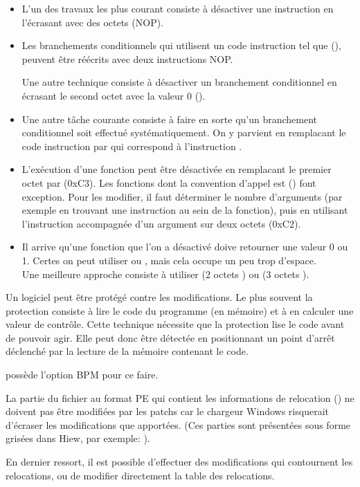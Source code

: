 \begin{itemize}

\item 
L'un des travaux les plus courant consiste à désactiver une instruction en l'écrasant avec des 
octets  (\ac{NOP}).

\item Les branchements conditionnels qui utilisent un code instruction tel que  (\JZ), 
peuvent être réécrits avec deux instructions \ac{NOP}.

Une autre technique consiste à désactiver un branchement conditionnel en écrasant le second octet 
avec la valeur 0 ().

\item 
Une autre tâche courante consiste à faire en sorte qu'un branchement conditionnel soit effectué 
systématiquement. On y parvient en remplacant le code instruction par  qui correspond à 
l'instruction \JMP.

\item L'exécution d'une fonction peut être désactivée en remplacant le premier octet par \RETN (0xC3).
Les fonctions dont la convention d'appel est  () font exception. 
Pour les modifier, il faut déterminer le nombre d'arguments (par exemple en trouvant une instruction 
\RETN au sein de la fonction), puis en utilisant l'instruction \RETN accompagnée d'un argument sur 
deux octets (0xC2).

\item Il arrive qu'une fonction que l'on a désactivé doive retourner une valeur 0 ou 1. Certes on 
peut utiliser  ou , mais cela occupe un peu trop d'espace.\\
Une meilleure approche consiste à utiliser  (2 octets ) ou 
 (3 octets ).

\end{itemize}

Un logiciel peut être protégé contre les modifications. Le plus souvent la protection consiste à 
lire le code du programme (en mémoire) et à en calculer une valeur de contrôle.
Cette technique nécessite que la protection lise le code avant de pouvoir agir. Elle peut donc être 
détectée en positionnant un point d'arrêt déclenché par la lecture de la mémoire contenant le code.

\tracer possède l'option BPM pour ce faire.

La partie du fichier au format PE qui contient les informations de relocation () 
ne doivent pas être modifiées par les patchs car le chargeur Windows risquerait d'écraser les 
modifications que apportées.
(Ces parties sont présentées sous forme grisées dans Hiew, par exemple:
).

En dernier ressort, il est possible d'effectuer des modifications qui contournent les relocations, 
ou de modifier directement la table des relocations.
